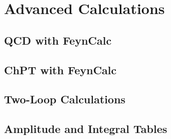 \section{Advanced Calculations}

\subsection{QCD with FeynCalc}

\subsection{ChPT with FeynCalc}

\subsection{Two-Loop Calculations}

\subsection{Amplitude and Integral Tables}
